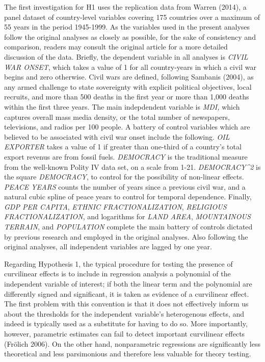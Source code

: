 \documentclass[12pt,article,oneside]{memoir}
\begin{document}
The first investigation for H1 uses the replication data from Warren
(2014), a panel dataset of country-level variables covering 175
countries over a maximum of 55 years in the period 1945-1999. As the
variables used in the present analyses follow the original analyses as
closely as possible, for the sake of consistency and comparison, readers
may consult the original article for a more detailed discussion of the
data. Briefly, the dependent variable in all analyses is \emph{CIVIL WAR
ONSET}, which takes a value of 1 for all country-years in which a civil
war begins and zero otherwise. Civil wars are defined, following
Sambanis (2004), as any armed challenge to state sovereignty with
explicit political objectives, local recruits, and more than 500 deaths
in the first year or more than 1,000 deaths within the first three
years. The main indepdendent variable is \emph{MDI,} which captures
overall mass media density, or the total number of newspapers,
televisions, and radios per 100 people. A battery of control variables
which are believed to be associated with civil war onset include the
following. \emph{OIL EXPORTER} takes a value of 1 if greater than
one-third of a country's total export revenus are from fossil fuels.
\emph{DEMOCRACY} is the traditional measure from the well-known Polity
IV data set, on a scale from 1-21. \emph{DEMOCRACY\^{}2} is the square
\emph{DEMOCRACY}, to control for the possibility of non-linear effects.
\emph{PEACE YEARS} counts the number of years since a previous civil
war, and a natural cubic spline of peace years to control for temporal
dependence. Finally, \emph{GDP PER CAPITA}, \emph{ETHNIC
FRACTIONALIZATION}, \emph{RELIGIOUS FRACTIONALIZATION}, and logarithms
for \emph{LAND AREA}, \emph{MOUNTAINOUS TERRAIN}, and \emph{POPULATION}
complete the main battery of controls dictated by previous research and
employed in the original analyses. Also following the original analyses,
all independent variables are lagged by one year.

Regarding Hypothesis 1, the typical procedure for testing the presence
of curvilinear effects is to include in regression analysis a polynomial
of the independent variable of interest; if both the linear term and the
polynomial are differently signed and significant, it is taken as
evidence of a curvilinear effect. The first problem with this convention
is that it does not effectively inform us about the thresholds for the
independent variable's heterogenous effects, and indeed is typically
used as a substitute for having to do so. More importantly, however,
parametric estimates can fail to detect important curvilinear effects
(Fr{ö}lich 2006). On the other hand, nonparametric regressions are
significantly less theoretical and less parsimonious and therefore less
valuable for theory testing.
\end{document}
